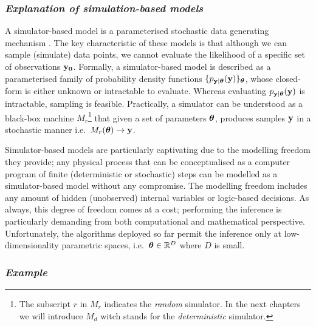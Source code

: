 \subsubsection*{\textit{Explanation of simulation-based models}}

A simulator-based model is a parameterised stochastic data generating
mechanism \autocite{Gutmann2016}. The key characteristic of these
models is that although we can sample (simulate) data points, we
cannot evaluate the likelihood of a specific set of observations
$\mathbf{y_0}$. Formally, a simulator-based model is described as a
parameterised family of probability density functions
$\{ p_{\mathbf{y}|\boldsymbol{\theta}}(\mathbf{y}) \}_{\boldsymbol{\theta}}$, whose closed-form is either
unknown or intractable to evaluate. Whereas evaluating
$p_{\mathbf{y}|\boldsymbol{\theta}}(\mathbf{y})$ is intractable, sampling is
feasible. Practically, a simulator can be understood as a black-box
machine $M_r$\footnote{The subscript $r$ in $M_r$ indicates the
  \textit{random} simulator. In the next chapters we will introduce
  $M_d$ witch stands for the \textit{deterministic} simulator.} that
given a set of parameters $\boldsymbol{\theta}$, produces samples $\mathbf{y}$ in a
stochastic manner i.e.\ $M_r(\boldsymbol{\theta}) \rightarrow \mathbf{y}$.

Simulator-based models are particularly captivating due to the
modelling freedom they provide; any physical process that can be
conceptualised as a computer program of finite (deterministic or
stochastic) steps can be modelled as a simulator-based model without
any compromise. The modelling freedom includes any amount of hidden
(unobserved) internal variables or logic-based decisions. As always,
this degree of freedom comes at a cost; performing the inference is
particularly demanding from both computational and mathematical
perspective. Unfortunately, the algorithms deployed so far permit the
inference only at low-dimensionality parametric spaces, i.e.\
$\boldsymbol{\theta} \in \mathbb{R}^D$ where $D$ is small.

\subsubsection*{\textit{Example}}

